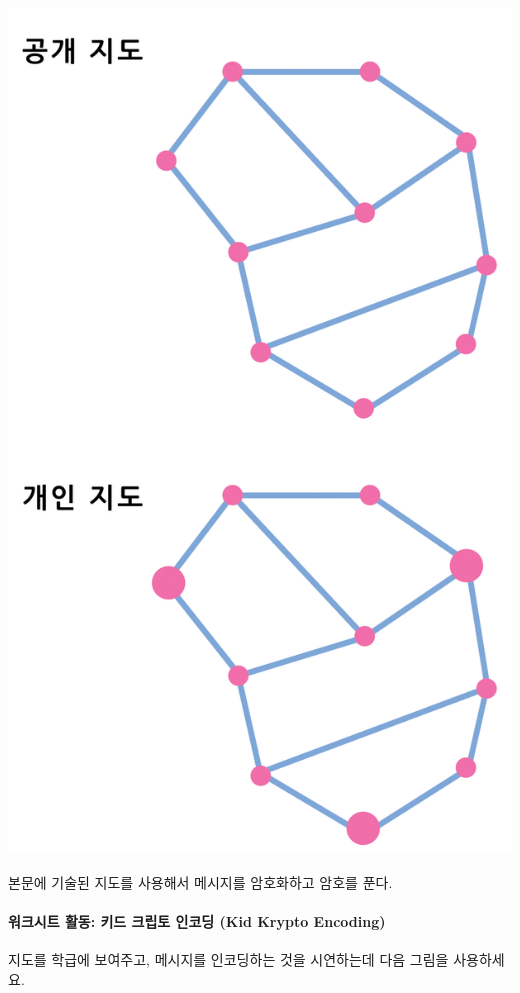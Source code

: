 \documentclass[]{article}
\begin{document}
\includegraphics{csunplugged/05-part/img/ch19-public-key/18-public-key-05-kid-krypto-map.png}

본문에 기술된 지도를 사용해서 메시지를 암호화하고 암호를 푼다.

\mbox{}\paragraph{워크시트 활동: 키드 크립토 인코딩 (Kid Krypto
Encoding)}\label{kid-krypto-encoding}

지도를 학급에 보여주고, 메시지를 인코딩하는 것을 시연하는데 다음 그림을
사용하세요.
\end{document}
